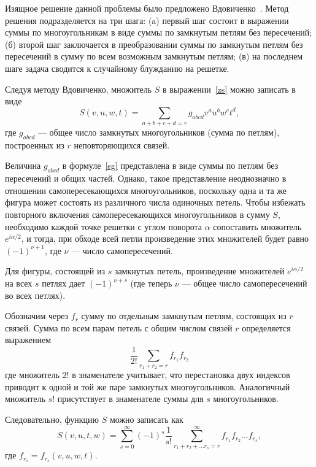 \documentclass[utf8,12pt]{jetp}
\begin{document}
Изящное решение данной проблемы было предложено Вдовиченко~\cite{vdovichenko1964}. Метод решения подразделяется на три шага: (a) первый шаг состоит в выражении суммы по многоугольникам в виде суммы по замкнутым петлям без пересечений; (б) второй шаг заключается в преобразовании суммы по замкнутым петлям без пересечений в сумму по всем возможным замкнутым петлям; (в) на последнем шаге задача сводится к случайному блужданию на решетке.

Следуя методу Вдовиченко, множитель $S$ в выражении~\eqref{zs} можно записать в виде
\begin{equation}
	S(v, u, w, t) = \sum_{a+b+c+d = r} g_{abcd} v^a u^b w^c t^d,
	\label{sg} 
\end{equation}
где $g_{abcd}$ --- общее число замкнутых многоугольников (сумма по петлям), построенных из $r$ неповторяющихся связей.

Величина $g_{abcd}$ в формуле~\eqref{sg} представлена в виде суммы по петлям без пересечений и общих частей. Однако, такое представление неоднозначно в отношении самопересекающихся многоугольников, поскольку одна и та же фигура может состоять из различного числа одиночных петель. Чтобы избежать повторного включения самопересекающихся многоугольников в сумму $S$, необходимо каждой точке решетки с углом поворота $\alpha$ сопоставить множитель $e^{i\alpha/2}$, и тогда, при обходе всей петли произведение этих множителей будет равно $(−1)^{\nu+1}$, где $\nu$ — число самопересечений.

Для фигуры, состоящей из $s$ замкнутых петель, произведение множителей $e^{i\alpha/2}$ на всех $s$ петлях дает $(−1)^{\nu+s}$ (где теперь $\nu$ --- общее число самопересечений во всех петлях).

Обозначим через $f_r$ сумму по отдельным замкнутым петлям, состоящих из $r$ связей. Сумма по всем парам петель с общим числом связей $r$ определяется выражением
\begin{equation*}
	\frac{1}{2!} \sum_{r_1 + r_2 = r} f_{r_1} f_{r_2}
\end{equation*}
где множитель $2!$ в знаменателе учитывает, что перестановка двух индексов приводит к одной и той же паре замкнутых многоугольников. Аналогичный множитель $s!$ присутствует в знаменателе суммы для $s$ многоугольников.

Следовательно, функцию $S$ можно записать как
\begin{equation}
	S (v, u, t, w) = \sum_{s = 0}^{\infty} (-1)^s \frac{1}{s!} \sum_{r_1 + r_2 + \dots r_s = r}^{\infty} f_{r_1} f_{r_2} \dots f_{r_s}, 
\end{equation}
где $f_{r_s} = f_{r_s}(v, u, w, t)$.
\end{document}
